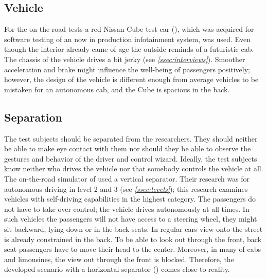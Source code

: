 \subsection{Vehicle}
For the on-the-road tests a red Nissan Cube test car (\emph{}), which was acquired for software testing of an now in production infotainment system, was used. Even though the interior already came of age the outside reminds of a futuristic cab. The chassis of the vehicle drives a bit jerky (see \emph{\ref{ssec:interviews}}). Smoother acceleration and brake might influence the well-being of passengers positively; however, the design of the vehicle is different enough from average vehicles to be mistaken for an autonomous cab, and the Cube is spacious in the back. 

\subsection{Separation}
The test subjects should be separated from the researchers. They should neither be able to make eye contact with them nor should they be able to observe the gestures and behavior of the driver and control wizard. Ideally, the test subjects know neither who drives the vehicle nor that somebody controls the vehicle at all. The on-the-road simulator of \citet{Baltodano2015} used a vertical separator. Their research was for autonomous driving in level 2 and 3 (see \emph{\ref{ssec:levels}}); this research examines vehicles with self-driving capabilities in the highest category. The passengers do not have to take over control; the vehicle drives autonomously at all times. In such vehicles the passengers will not have access to a steering wheel, they might sit backward, lying down or in the back seats. In regular cars view onto the street is already constrained in the back. To be able to look out through the front, back seat passengers have to move their head to the center. Moreover, in many of cabs and limousines, the view out through the front is blocked. Therefore, the developed scenario with a horizontal separator (\emph{}) comes close to reality. 
